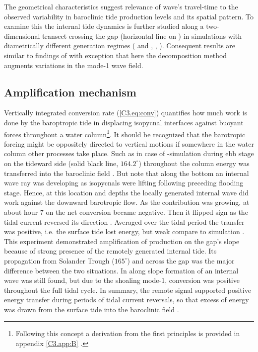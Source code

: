 \documentclass[12pt]{article}
\begin{document}
The geometrical characteristics suggest relevance of wave's travel-time to the observed variability in baroclinic tide 
production levels and its spatial pattern. To examine this the internal tide dynamics is further 
studied along a two-dimensional transect crossing the gap (horizontal line on 
) in simulations with diametrically different generation regimes ( 
and , , ). Consequent 
results are similar to findings of \cite{echeverri2010internal, buijsman2012double} with 
exception that here the decomposition method augments variations in the mode-1 wave field.\\

\subsection{Amplification mechanism}
\label{C3.sec:amp_mech}
Vertically integrated conversion rate (\ref{C3.eq:conv}) quantifies how much work is done by the 
baroptropic tide in displacing isopycnal interfaces against buoyant forces throughout a water 
column\footnote{Following this concept a derivation from the first principles is provided in 
appendix \ref{C3.app:B} \citep[see also][]{kurapov2003m, kelly2010topo}.}. It should be recognized 
that the barotropic forcing might be oppositely directed to vertical motions if somewhere in the 
water column other processes take place. Such as in case of -simulation 
 during ebb stage on the tideward side (solid black line, 
$164.2^{\circ}$) throughout the column energy was transferred into the baroclinic field 
. But note that along the bottom an internal wave ray was developing as 
isopycnals were lifting following preceding flooding stage. Hence, at this location and depths the 
locally generated internal wave did work against the downward barotropic flow. As the contribution 
was growing, at about hour 7 on  the net conversion became negative. Then 
it flipped sign as the tidal current reversed its direction . Averaged 
over the tidal period the transfer was positive, i.e. the surface tide lost energy, but weak 
compare to  simulation . This experiment demonstrated  
amplification of production on the gap's slope because of strong presence of the remotely generated 
internal tide. Its propagation from Solander Trough ($165^{\circ}$) and across the gap was the 
major 
difference between the two situations. In  along slope formation of an internal wave 
was still found, but due to the shoaling mode-1, conversion was positive throughout the full tidal 
cycle. In summary, the remote signal supported positive energy transfer during periods of tidal 
current reversals, so that excess of energy was drawn from the surface tide into the baroclinic 
field .\\
\end{document}
